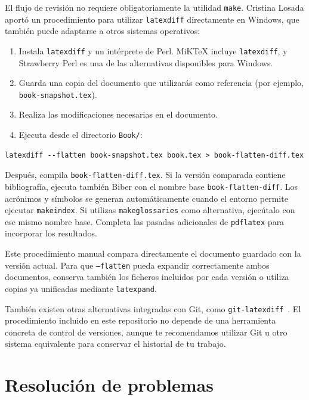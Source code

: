 El flujo de revisión no requiere obligatoriamente la utilidad \texttt{make}. Cristina Losada aportó un procedimiento para utilizar \texttt{latexdiff} directamente en Windows, que también puede adaptarse a otros sistemas operativos:

\begin{enumerate}
  \item Instala \texttt{latexdiff} y un intérprete de Perl. MiKTeX incluye \texttt{latexdiff}, y Strawberry Perl es una de las alternativas disponibles para Windows.
  \item Guarda una copia del documento que utilizarás como referencia (por ejemplo, \texttt{book-snapshot.tex}).
  \item Realiza las modificaciones necesarias en el documento.
  \item Ejecuta desde el directorio \texttt{Book/}:
\end{enumerate}

\begin{verbatim}
latexdiff --flatten book-snapshot.tex book.tex > book-flatten-diff.tex
\end{verbatim}

Después, compila \texttt{book-flatten-diff.tex}. Si la versión comparada contiene bibliografía, ejecuta también Biber con el nombre base \texttt{book-flatten-diff}. Los acrónimos y símbolos se generan automáticamente cuando el entorno permite ejecutar \texttt{makeindex}. Si utilizas \texttt{makeglossaries} como alternativa, ejecútalo con ese mismo nombre base. Completa las pasadas adicionales de \texttt{pdflatex} para incorporar los resultados.

Este procedimiento manual compara directamente el documento guardado con la versión actual. Para que \texttt{--flatten} pueda expandir correctamente ambos documentos, conserva también los ficheros incluidos por cada versión o utiliza copias ya unificadas mediante \texttt{latexpand}.

También existen otras alternativas integradas con Git, como \texttt{git-latexdiff}~\cite{git-latexdiff}. El procedimiento incluido en este repositorio no depende de una herramienta concreta de control de versiones, aunque te recomendamos utilizar Git u otro sistema equivalente para conservar el historial de tu trabajo.

\section{Resolución de problemas}
\label{sec:problemas-conocidos}

